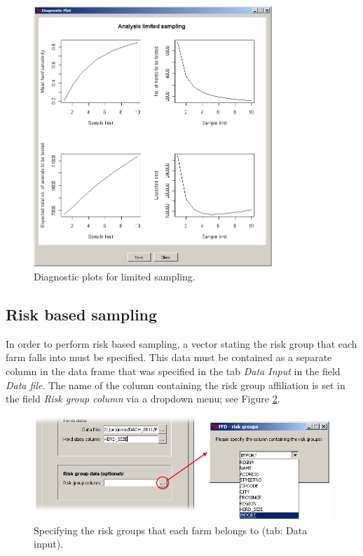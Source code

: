 \documentclass[nojss]{jss}
\begin{document}
\begin{figure}[h!t]
\begin{center}
\includegraphics[width=90mm]{GUI_diag_ltd2.png}
\end{center}
\caption{Diagnostic plots for limited sampling.} \label{fig:GUI_diag_ltd2}
\end{figure}


\subsection{Risk based sampling}
\label{subsec:GUI_riskBased}

In order to perform risk based sampling, a vector stating the risk group that each farm falls into must be specified. This data must be contained as a separate column in the data frame that was specified in the tab \emph{Data Input}  in the field  \emph{Data file}. The name of the column containing the risk group affiliation is set in the field  \emph{Risk group column} via a dropdown menu; see Figure \ref{fig:GUI_Risk_Group}.

\begin{figure}[h!t]
\begin{center}
\includegraphics[width=125mm]{GUI_Risk_Group.png}
\end{center}
\caption{Specifying the risk groups that each farm belongs to (tab: Data input).}
\label{fig:GUI_Risk_Group} \end{figure}
\end{document}
